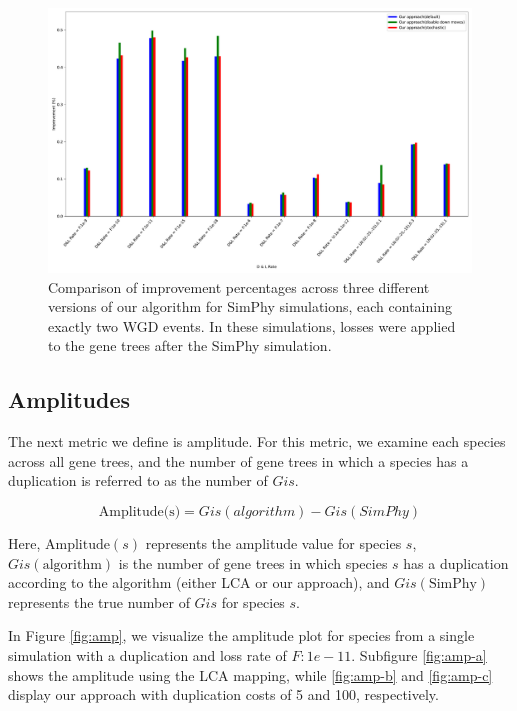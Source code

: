 \documentclass[10pt]{article}
\begin{document}
\begin{figure}[hbt!]
    \centering
    \includegraphics[width=1\textwidth]{figs_theory/imp_2WGD_allalgo_d5.pdf}
    \caption{Comparison of improvement percentages across three different versions of our algorithm for SimPhy simulations, each containing exactly two WGD events. In these simulations, losses were applied to the gene trees after the SimPhy simulation.}
    \label{fig:imp_2wgd_allalg}
\end{figure}


\subsection{Amplitudes}

The next metric we define is amplitude. For this metric, we examine each species across all gene trees, and the number of gene trees in which a species has a duplication is referred to as the number of $Gis$.

$$
\text{Amplitude(s)} = Gis(algorithm) - Gis(SimPhy)
$$

Here, $\text{Amplitude}(s)$ represents the amplitude value for species $s$, $Gis(\text{algorithm})$ is the number of gene trees in which species $s$ has a duplication according to the algorithm (either LCA or our approach), and $Gis(\text{SimPhy})$ represents the true number of $Gis$ for species $s$.


In Figure \ref{fig:amp}, we visualize the amplitude plot for species from a single simulation with a duplication and loss rate of $F:1e-11$. Subfigure \ref{fig:amp-a} shows the amplitude using the LCA mapping, while \ref{fig:amp-b} and \ref{fig:amp-c} display our approach with duplication costs of 5 and 100, respectively.
\end{document}
